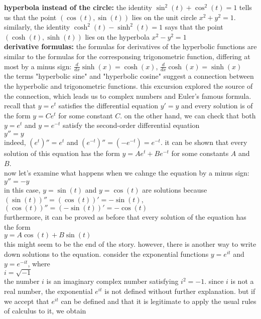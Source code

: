 \documentclass{article}
\begin{document}
\textbf{hyperbola instead of the circle:} the identity $\sin^2(t) + \cos^2(t) = 1$ tells us that the point $(\cos(t), \sin(t))$ lies on the unit circle $x^2 + y^2 = 1$. similarly, the identity $\cosh^2(t) - \sinh^2(t) = 1$ says that the point $(\cosh(t), \sinh(t))$ lies on the hyperbola $x^2 - y^2 = 1$\\

\textbf{derivative formulas:} the formulas for derivatives of the hyperbolic functions are similar to the formulas for the corresponsing trigonometric function, differing at most by a minus sign: $\frac{d}{dx}\sinh(x) = \cosh(x)$, $\frac{d}{dx}\cosh(x) = \sinh(x)$\\

the terms "hyperbolic sine" and "hyperbolic cosine" suggest a connection between the hyperbolic and trigonometric functions. this excursion explored the source of the connection, which leads us to complex numbers and Euler's famous formula.\\ recall that $y = e^t$ satisfies the differential equation $y' = y$ and every solution is of the form $y = Ce^t$ for some constant $C$. on the other hand, we can check that both $y = e^t$ and $y = e^{-t}$ satisfy the second-order differential equation\\ $y'' = y$\\ indeed, $(e^t)'' = e^t$ and $(e^{-t})'' = (-e^{-t}) = e^{-t}$. it can be shown that every solution of this equation has the form $y = Ae^t + Be^{-t}$ for some constants $A$ and $B$.\\ now let's examine what happens when we cahnge the equation by a minus sign:\\ $y'' = -y$\\ in this case, $y = \sin(t)$ and $y = \cos(t)$ are solutions because\\ $(\sin(t))'' = (\cos(t))' = -\sin(t)$, $(\cos(t))'' = (-\sin(t))' = -\cos(t)$\\ furthermore, it can be proved as before that every solution of the equation has the form\\ $y = A\cos(t) + B\sin(t)$\\ this might seem to be the end of the story. however, there is another way to write down solutions to the equation. consider the exponential functions $y = e^{it}$ and $y = e^{-it}$, where\\ $i = \sqrt{-1}$\\ the number $i$ is an imaginary complex number satisfying $i^2 = -1$. since $i$ is not a real number, the exponential $e^{it}$ is not defined without further explanation. but if we accept that $e^{it}$ can be defined and that it is legitimate to apply the usual rules of calculus to it, we obtain\\
\end{document}

